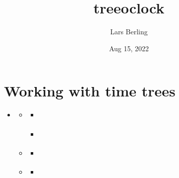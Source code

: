 \documentclass[letterpaper,10pt,english]{sphinxmanual}
\title{treeoclock}
\date{Aug 15, 2022}
\author{Lars Berling}
\begin{document}
\pagestyle{empty}
\sphinxmaketitle
\pagestyle{plain}
\sphinxtableofcontents
\pagestyle{normal}
\label{\detokenize{index::doc}}



\chapter{Working with time trees}
\label{\detokenize{trees:working-with-time-trees}}\label{\detokenize{trees::doc}}
\begin{sphinxShadowBox}
\begin{itemize}
\item {} 
\sphinxAtStartPar
{}\label{\detokenize{trees:id3}}{\hyperref[\detokenize{trees:working-with-time-trees}]{}}
\begin{itemize}
\item {} 
\sphinxAtStartPar
{}\label{\detokenize{trees:id4}}{\hyperref[\detokenize{trees:the-timetree-class}]{}}
\begin{itemize}
\item {} 
\sphinxAtStartPar
{}\label{\detokenize{trees:id5}}{\hyperref[\detokenize{trees:timetree-attributes}]{}}

\item {} 
\sphinxAtStartPar
{}\label{\detokenize{trees:id6}}{\hyperref[\detokenize{trees:ete3-functionalities}]{}}

\end{itemize}

\item {} 
\sphinxAtStartPar
{}\label{\detokenize{trees:id7}}{\hyperref[\detokenize{trees:the-timetreeset-class}]{}}
\begin{itemize}
\item {} 
\sphinxAtStartPar
{}\label{\detokenize{trees:id8}}{\hyperref[\detokenize{trees:reading-trees}]{}}

\end{itemize}

\item {} 
\sphinxAtStartPar
{}\label{\detokenize{trees:id9}}{\hyperref[\detokenize{trees:general-functions}]{}}
\begin{itemize}
\item {} 
\sphinxAtStartPar
{}\label{\detokenize{trees:id10}}{\hyperref[\detokenize{trees:working-with-findpath-path-and-c-memory}]{}}


\end{itemize}
\end{itemize}
\end{itemize}
\end{sphinxShadowBox}
\end{document}
